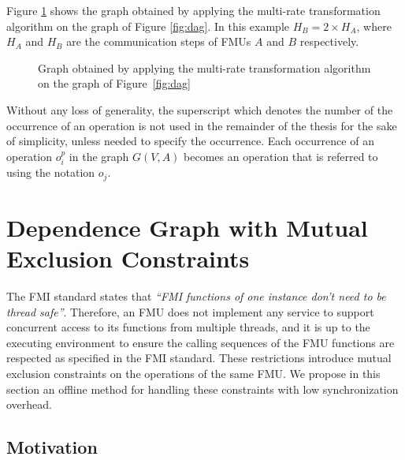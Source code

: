 Figure \ref{fig:dagmr} shows the graph obtained by applying the multi-rate transformation algorithm on the graph of Figure \ref{fig:dag}. In this example $H_B = 2 \times H_A$, where $H_A$ and $H_B$ are the communication steps of FMUs $A$ and $B$ respectively.

\begin{figure}[htb]
\captionsetup{justification=centering}
\centering
  
\caption{Graph obtained by applying the multi-rate transformation algorithm on the graph of Figure~\ref{fig:dag}}
\label{fig:dagmr}
\end{figure}

Without any loss of generality, the superscript which denotes the number of the occurrence of an operation is not used in the remainder of the thesis for the sake of simplicity, unless needed to specify the occurrence. Each occurrence of an operation $o_i^p$ in the graph $G(V,A)$ becomes an operation that is referred to using the notation $o_j$.

\section{Dependence Graph with Mutual Exclusion Constraints}
The FMI standard states that \textit{``FMI functions of one instance don't need to be thread safe''}. Therefore, an FMU does not implement any service to support concurrent access to its functions from multiple threads, and it is up to the executing environment to ensure the calling sequences of the FMU functions are respected as specified in the FMI standard. These restrictions introduce mutual exclusion constraints on the operations of the same FMU. We propose in this section an offline method for handling these constraints with low synchronization overhead.

\subsection{Motivation}

